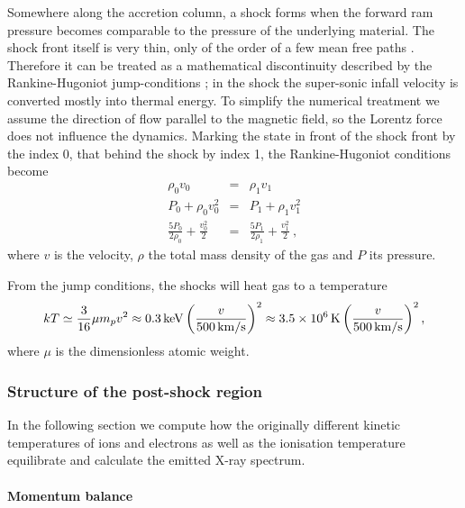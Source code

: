 Somewhere along the accretion column, a shock forms when the forward ram pressure becomes comparable to the pressure of the underlying material. The shock front itself is very thin, only of the order of a few mean free paths \cite{raizerzeldovich}. Therefore it can be treated as a mathematical discontinuity described by the Rankine-Hugoniot jump-conditions \cite[][chap.~7, \S~15]{raizerzeldovich}; in the shock the super-sonic infall velocity is converted mostly into thermal energy. To simplify the numerical treatment we assume the direction of flow parallel to the magnetic field, so the Lorentz force does not influence the dynamics. Marking the state in front of the shock front by the index 0, that behind the shock by index 1, the Rankine-Hugoniot conditions become
\begin{eqnarray}
\rho_0 v_0 &=& \rho_1 v_1 \label{RH1}\\
P_0+\rho_0 v_0^2 &=& P_1+\rho_1 v_1^2 \label{RH2}\\
\frac{5 P_0}{2\rho_0}+\frac{v_0^2}{2}&=&\frac{5 P_1}{2\rho_1}+\frac{v_1^2}{2} \ ,\label{RH3}
\end{eqnarray}
where $v$ is the velocity, $\rho$ the total mass density of the gas and $P$ its pressure. 

From the jump conditions, the shocks will heat gas to a temperature
\begin{equation}
kT \simeq \frac{3}{16}\mu m_p v^{2} \approx 0.3\,{\rm keV}\left(\frac{v}{500\,{\rm km/s}}\right)^{2} \approx3.5\times10^6\,{\rm K} \left(\frac{v}{500\,{\rm km/s}}\right)^{2},
\label{eqn:Tshock}
\end{equation}
where $\mu$ is the dimensionless atomic weight.

\subsubsection{Structure of the post-shock region}

In the following section we compute how the originally different kinetic temperatures of ions and electrons as well as the ionisation temperature
equilibrate and calculate the emitted X-ray spectrum.

\paragraph{Momentum balance}\label{hydrodyn}

